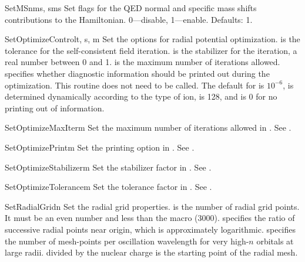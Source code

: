 \begin{fundesc}{SetMS}{nms, sms}
Set flags for the QED normal and specific mass shifts contributions to the
Hamiltonian. 0---disable, 1---enable. Defaults: 1.
\end{fundesc}

\begin{fundesc}{SetOptimizeControl}{t, s, m}
Set the options for radial potential optimization.  is the tolerance for
the self-consistent field iteration.  is the stabilizer for the
iteration, a real number between 0 and 1.  is the maximum number of
iterations allowed.   specifies whether diagnostic information should be
printed out during the optimization. This routine does not need to be called.
The default for  is $10^{-6}$,  is determined dynamically
according to the type of ion,  is 128, and  is 0 for no printing
out of information. 
\end{fundesc}

\begin{fundesc}{SetOptimizeMaxIter}{m}
Set the maximum number of iterations allowed in . See
.
\end{fundesc}

\begin{fundesc}{SetOptimizePrint}{m}
Set the printing option in . See
.
\end{fundesc}

\begin{fundesc}{SetOptimizeStabilizer}{m}
Set the stabilizer factor in . See
.
\end{fundesc}

\begin{fundesc}{SetOptimizeTolerance}{m}
Set the tolerance factor in . See
.
\end{fundesc}

\begin{fundesc}{SetRadialGrid}{n}
Set the radial grid properties.  is the number of radial grid points. It
must be an even number and less than the macro  (3000). 
specifies the ratio of successive radial points near  origin, which is
approximately logarithmic.  specifies the number of mesh-points per
oscillation wavelength for very high-$n$ orbitals at large  radii. 
divided by the nuclear charge is the starting point of the radial mesh.
\end{fundesc}

